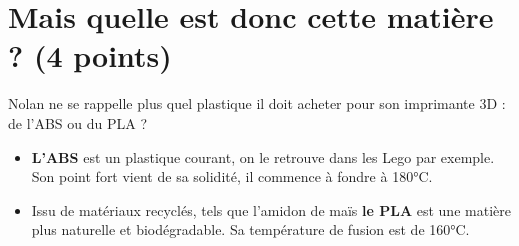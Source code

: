\section{Mais quelle est donc cette matière ? (4 points)}

Nolan ne se rappelle plus quel plastique il doit acheter pour son imprimante 3D : de l'ABS ou du PLA ?

\begin{itemize}
	\item \textbf{L'ABS} est un plastique courant, on le retrouve dans les Lego par exemple. Son point fort vient de sa solidité, il commence à fondre à 180°C.
	
	\item Issu de matériaux recyclés, tels que l'amidon de maïs \textbf{le PLA} est une matière plus naturelle et biodégradable. Sa température de fusion est de 160°C.	
\end{itemize}

